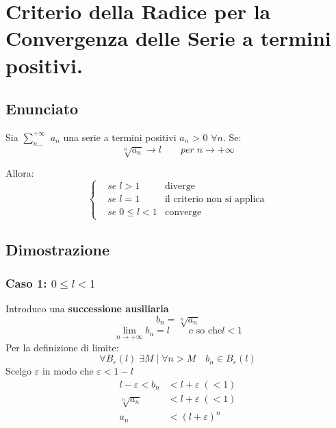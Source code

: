 \documentclass[../dimostrazioni]{subfiles}
\begin{document}
    \chapter{Criterio della Radice per la Convergenza delle Serie a termini positivi.}
    \label{criterioRadiceSerie}

        \section*{Enunciato}

            Sia \(\sum_{n\dots}^{+\infty}\) \(a_n\) una serie a termini positivi \(a_n\) > 0 \(\forall n\). Se:
             \[\sqrt[n]{a_n} \longrightarrow l \qquad  per \; n  \rightarrow +\infty \]
                
            
            Allora:
            \[
                \left\{
                    \begin{aligned}
                        &se \; l > 1 & \text{diverge} \\
                        &se \; l = 1 & \text{il criterio non si applica} \\
                        &se \; 0 \leqslant l < 1 & \text{converge}
                    \end{aligned}
                \right.
            \]
            
        \section*{Dimostrazione}
            
            \subsection*{Caso 1:  \(0 \leqslant l < 1\)} 
                    
                Introduco una \textbf{successione ausiliaria}
                \[b_n = \sqrt[n]{a_n} \]  
                \[\lim_{n \to +\infty} b_n = l \qquad \text{e so che} l < 1\]
                Per la definizione di limite:
                \[\forall B_\varepsilon (l) \; \exists M \mid \forall n > M \quad b_n \in B_\varepsilon (l) \]
                Scelgo \(\varepsilon\) in modo che \(\varepsilon < 1 -l \)
                \begin{align*}
                    l - \varepsilon < b_n &< l + \varepsilon \; (<1) \\
                    \sqrt[n]{a_n} &< l + \varepsilon \; (<1) \\
                    a_n &< (l+\varepsilon)^{n}  
                \end{align*}
                                     
\end{document}
